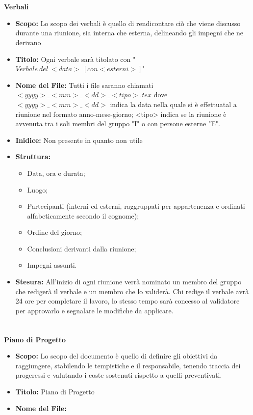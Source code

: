 \documentclass[a4paper, 12pt]{article}
\begin{document}
\paragraph{}\\
\textbf{Verbali}
\begin{itemize}
    \item \textbf{Scopo:} Lo scopo dei verbali è quello di rendicontare ciò che viene discusso durante una riunione, sia interna che esterna, delineando gli impegni che ne derivano
    \item \textbf{Titolo:} Ogni verbale sarà titolato con "$Verbale \ del \ <data> \ [con <esterni>]$"
    \item \textbf{Nome del File:} Tutti i file saranno chiamati $<yyyy>\_<mm>\_<dd>\_<tipo>.tex$ dove $<yyyy>\_<mm>\_<dd>$ indica la data nella quale si è effettuatal a riunione nel formato anno-mese-giorno; <tipo> indica se la riunione è avvenuta tra i soli membri del gruppo "I" o con persone esterne "E".
    \item \textbf{Inidice:} Non presente in quanto non utile
    \item \textbf{Struttura:}
    \begin{itemize}
        \item Data, ora e durata;
        \item Luogo;
        \item Partecipanti (interni ed esterni, raggruppati per appartenenza e ordinati alfabeticamente secondo il cognome);
        \item Ordine del giorno;
        \item Conclusioni derivanti dalla riunione;
        \item Impegni assunti.
    \end{itemize}
    \item \textbf{Stesura:} All'inizio di ogni riunione verrà nominato un membro del gruppo che redigerà il verbale e un membro che lo validerà. Chi redige il verbale avrà 24 ore per completare il lavoro, lo stesso tempo sarà concesso al validatore per approvarlo e segnalare le modifiche da applicare.
\end{itemize}
\paragraph{}\\
\textbf{Piano di Progetto}
\begin{itemize}
    \item \textbf{Scopo:} Lo scopo del documento è quello di definire gli obiettivi da raggiungere, stabilendo le tempistiche e il responsabile, tenendo traccia dei progeressi e valutando i coste sostenuti rispetto a quelli preventivati.
    \item \textbf{Titolo:} Piano di Progetto
    \item \textbf{Nome del File:} 
\end{itemize}
\end{document}
